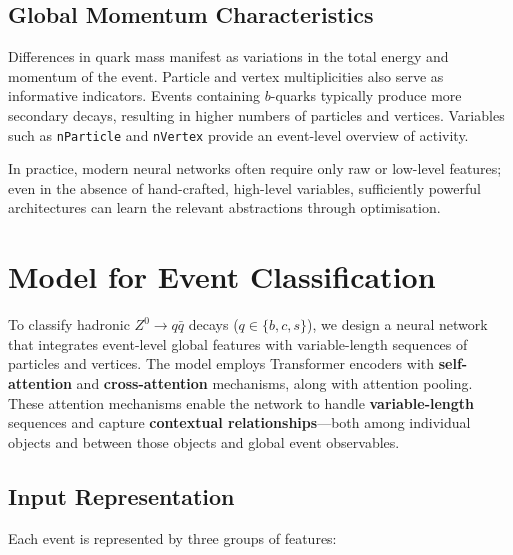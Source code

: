 \documentclass[11pt]{article}
\begin{document}
\subsection{Global Momentum Characteristics}

Differences in quark mass manifest as variations in the total energy and momentum of the event. Particle and vertex multiplicities also serve as informative indicators. Events containing \( b \)-quarks typically produce more secondary decays, resulting in higher numbers of particles and vertices. Variables such as \texttt{nParticle} and \texttt{nVertex} provide an event-level overview of activity.

In practice, modern neural networks often require only raw or low-level features; even in the absence of hand-crafted, high-level variables, sufficiently powerful architectures can learn the relevant abstractions through optimisation.



\section{Model for Event Classification}


To classify hadronic \( Z^0 \rightarrow q\bar{q} \) decays (\( q \in \{b, c, s\} \)), we design a neural network that integrates event-level global features with variable-length sequences of particles and vertices. The model employs Transformer encoders with \textbf{self-attention} and \textbf{cross-attention} mechanisms, along with attention pooling. These attention mechanisms enable the network to handle \textbf{variable-length} sequences and capture \textbf{contextual relationships}—both among individual objects and between those objects and global event observables.


\subsection{Input Representation}

Each event is represented by three groups of features:
\end{document}
